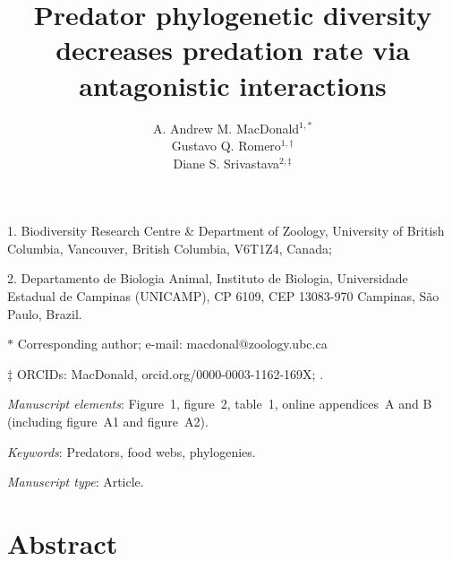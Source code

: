 \documentclass[11pt]{article}
\title{Predator phylogenetic diversity decreases predation rate via antagonistic interactions}
\author{A. Andrew M. MacDonald$^{1,\ast}$ \\ 
Gustavo Q. Romero$^{1,\dag}$ \\ 
Diane S. Srivastava$^{2,\ddag}$}
\date{}
\begin{document}
\maketitle

\noindent{}1. Biodiversity Research Centre & Department of Zoology, University of British Columbia, Vancouver, British Columbia, V6T1Z4, Canada;

\noindent{}2. Departamento de Biologia Animal, Instituto de Biologia, Universidade Estadual de Campinas (UNICAMP), CP 6109, CEP 13083-970 Campinas, S\~{a}o Paulo, Brazil.

\noindent{}$\ast$ Corresponding author; e-mail: macdonal@zoology.ubc.ca

\noindent{}$\ddag$ ORCIDs: MacDonald, orcid.org/0000-0003-1162-169X; .

\bigskip

\textit{Manuscript elements}: Figure~1, figure~2, table~1, online
appendices~A and B (including figure~A1 and figure~A2). %

\bigskip

\textit{Keywords}: Predators, food webs, phylogenies.

\bigskip

\textit{Manuscript type}: Article. 

\bigskip


\linenumbers{}
\modulolinenumbers[3]

\newpage{}

\section*{Abstract}
\end{document}
